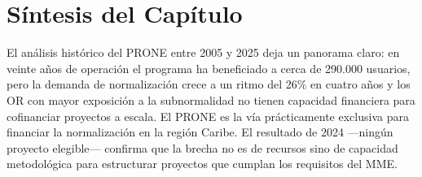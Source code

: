 \section{Síntesis del Capítulo}
\label{sec:sintesis_cap4}

El análisis histórico del PRONE entre 2005 y 2025 deja un panorama
claro: en veinte años de operación el programa ha beneficiado a cerca
de 290.000 usuarios, pero la demanda de normalización crece a un ritmo
del 26\% en cuatro años y los OR con mayor exposición a la subnormalidad
no tienen capacidad financiera para cofinanciar proyectos a escala. El
PRONE es la vía prácticamente exclusiva para financiar la normalización
en la región Caribe. El resultado de 2024 —ningún proyecto elegible—
confirma que la brecha no es de recursos sino de capacidad metodológica
para estructurar proyectos que cumplan los requisitos del MME.